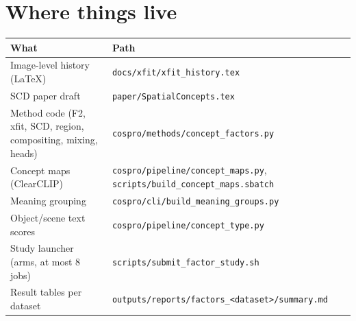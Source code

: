 \documentclass[11pt]{article}
\begin{document}
\section{Where things live}
\begin{table}[H]
\centering
\footnotesize
\begin{tabularx}{\linewidth}{>{\raggedright\arraybackslash}p{4.3cm} >{\raggedright\arraybackslash}X}
\toprule
What & Path \\
\midrule
Image-level history (LaTeX) & \texttt{docs/xfit/xfit\_history.tex} \\
SCD paper draft & \texttt{paper/SpatialConcepts.tex} \\
Method code (F2, xfit, SCD, region, compositing, mixing, heads) & \texttt{cospro/methods/concept\_factors.py} \\
Concept maps (ClearCLIP) & \texttt{cospro/pipeline/concept\_maps.py}, \texttt{scripts/build\_concept\_maps.sbatch} \\
Meaning grouping & \texttt{cospro/cli/build\_meaning\_groups.py} \\
Object/scene text scores & \texttt{cospro/pipeline/concept\_type.py} \\
Study launcher (arms, at most 8 jobs) & \texttt{scripts/submit\_factor\_study.sh} \\
Result tables per dataset & \texttt{outputs/reports/factors\_<dataset>/summary.md} \\
\bottomrule
\end{tabularx}
\end{table}
\end{document}
